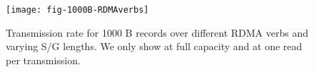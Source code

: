 \begin{figure}[H]
\texttt{[image: fig-1000B-RDMAverbs]}
\caption{Transmission rate for 1000 B records over different RDMA verbs and 
varying S/G lengths. We only show  at full capacity and  at one read per transmission.}
\label{fig:1000B_transrate}
\end{figure}
